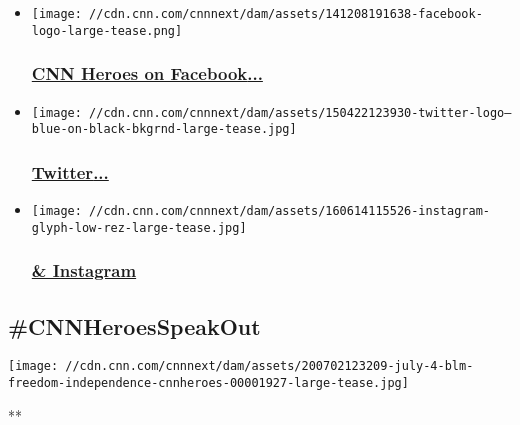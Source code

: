 \begin{itemize}
\item
  \href{https://www.facebook.com/CNNHeroes}{}

  \texttt{[image: //cdn.cnn.com/cnnnext/dam/assets/141208191638-facebook-logo-large-tease.png]}

  \hypertarget{cnn-heroes-on-facebook}{%
  \subsubsection{\texorpdfstring{\href{https://www.facebook.com/CNNHeroes}{\textbf{CNN
  Heroes on
  Facebook}...}}{CNN Heroes on Facebook...}}\label{cnn-heroes-on-facebook}}
\item
  \href{http://twitter.com/CNNHeroes}{}

  \texttt{[image: //cdn.cnn.com/cnnnext/dam/assets/150422123930-twitter-logo---blue-on-black-bkgrnd-large-tease.jpg]}

  \hypertarget{twitter}{%
  \subsubsection{\texorpdfstring{\href{http://twitter.com/CNNHeroes}{\textbf{Twitter}...}}{Twitter...}}\label{twitter}}
\item
  \href{https://instagram.com/cnnheroes/}{}

  \texttt{[image: //cdn.cnn.com/cnnnext/dam/assets/160614115526-instagram-glyph-low-rez-large-tease.jpg]}

  \hypertarget{-instagram}{%
  \subsubsection{\texorpdfstring{\href{https://instagram.com/cnnheroes/}{\textbf{\&
  Instagram}}}{\& Instagram}}\label{-instagram}}
\end{itemize}

\hypertarget{cnnheroesspeakout}{%
\subsection{\#CNNHeroesSpeakOut}\label{cnnheroesspeakout}}

\href{/videos/tv/2020/07/02/july-4-blm-freedom-independence-cnnheroes.cnn}{}

\texttt{[image: //cdn.cnn.com/cnnnext/dam/assets/200702123209-july-4-blm-freedom-independence-cnnheroes-00001927-large-tease.jpg]}

**

